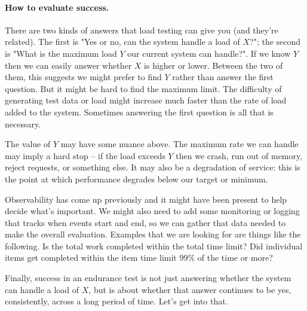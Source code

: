 \paragraph{How to evaluate success.}
There are two kinds of answers that load testing can give you (and they're related). The first is "Yes or no, can the system handle a load of $X$?"; the second is "What is the maximum load $Y$ our current system can handle?". If we know $Y$ then we can easily answer whether $X$ is higher or lower. Between the two of them, this suggests we might prefer to find $Y$ rather than answer the first question. But it might be hard to find the maximum limit. The difficulty of generating test data or load might increase much faster than the rate of load added to the system. Sometimes answering the first question is all that is necessary.

The value of $Y$ may have some nuance above. The maximum rate we can handle may imply a hard stop -- if the load exceeds $Y$ then we crash, run out of memory, reject requests, or something else. It may also be a degradation of service: this is the point at which performance degrades below our target or minimum. 

Observability has come up previously and it might have been present to help decide what's important. We might also need to add some monitoring or logging that tracks when events start and end, so we can gather that data needed to make the overall evaluation. Examples that we are looking for are things like the following. Is the total work completed within the total time limit? Did individual items get completed within the item time limit 99\% of the time or more? 

Finally, success in an endurance test is not just answering whether the system can handle a load of $X$, but is about whether that answer continues to be yes, consistently, across a long period of time. Let's get into that.

